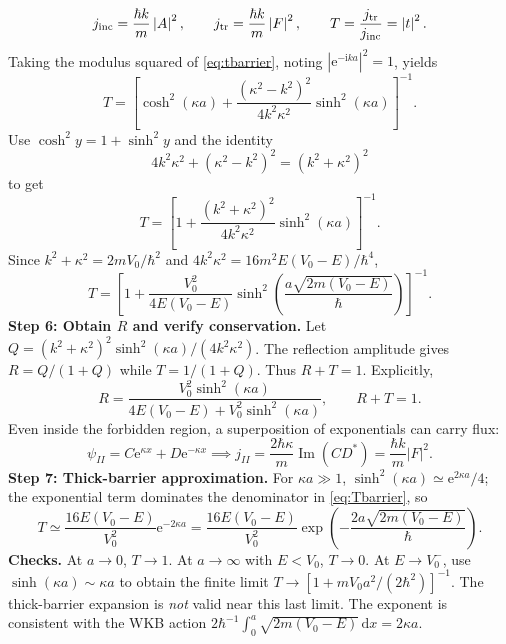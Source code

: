 \documentclass[11pt,a4paper]{article}
\newcommand{\dd}{\mathrm{d}}
\newcommand{\iu}{\mathrm{i}}
\newcommand{\ee}{\mathrm{e}}
\newcommand{\abs}[1]{\left|#1\right|}
\begin{document}
\begin{equation}
j_{\rm inc}=\frac{\hbar k}{m}\abs A^2,\qquad j_{\rm tr}=\frac{\hbar k}{m}\abs F^2,\qquad T=\frac{j_{\rm tr}}{j_{\rm inc}}=\abs t^2.
\end{equation}
Taking the modulus squared of \eqref{eq:tbarrier}, noting $\abs{\ee^{-\iu ka}}^2=1$, yields
\begin{equation}
T=\left[\cosh^2(\kappa a)+\frac{(\kappa^2-k^2)^2}{4k^2\kappa^2}\sinh^2(\kappa a)\right]^{-1}.
\end{equation}
Use $\cosh^2 y=1+\sinh^2y$ and the identity
\begin{equation}
4k^2\kappa^2+(\kappa^2-k^2)^2=(k^2+\kappa^2)^2
\end{equation}
to get
\begin{equation}
T=\left[1+\frac{(k^2+\kappa^2)^2}{4k^2\kappa^2}\sinh^2(\kappa a)\right]^{-1}.
\end{equation}
Since $k^2+\kappa^2=2mV_0/\hbar^2$ and $4k^2\kappa^2=16m^2E(V_0-E)/\hbar^4$,
\begin{equation}\label{eq:Tbarrier}
\boxed{T=\left[1+\frac{V_0^2}{4E(V_0-E)}\sinh^2\left(\frac{a\sqrt{2m(V_0-E)}}\hbar\right)\right]^{-1}.}
\end{equation}
\textbf{Step 6: Obtain $R$ and verify conservation.} Let $Q=(k^2+\kappa^2)^2\sinh^2(\kappa a)/(4k^2\kappa^2)$. The reflection amplitude gives $R=Q/(1+Q)$ while $T=1/(1+Q)$. Thus $R+T=1$. Explicitly,
\begin{equation}
\boxed{R=\frac{V_0^2\sinh^2(\kappa a)}{4E(V_0-E)+V_0^2\sinh^2(\kappa a)},\qquad R+T=1.}
\end{equation}
Even inside the forbidden region, a superposition of exponentials can carry flux:
\begin{equation}
\psi_{II}=C\ee^{\kappa x}+D\ee^{-\kappa x}\implies
j_{II}=\frac{2\hbar\kappa}{m}\operatorname{Im}(CD^*)=\frac{\hbar k}{m}\abs F^2.
\end{equation}
\textbf{Step 7: Thick-barrier approximation.} For $\kappa a\gg1$, $\sinh^2(\kappa a)\simeq\ee^{2\kappa a}/4$; the exponential term dominates the denominator in \eqref{eq:Tbarrier}, so
\begin{equation}
\boxed{T\simeq\frac{16E(V_0-E)}{V_0^2}\ee^{-2\kappa a}
=\frac{16E(V_0-E)}{V_0^2}\exp\left(-\frac{2a\sqrt{2m(V_0-E)}}{\hbar}\right).}
\end{equation}
\textbf{Checks.} At $a\to0$, $T\to1$. At $a\to\infty$ with $E<V_0$, $T\to0$. At $E\to V_0^-$, use $\sinh(\kappa a)\sim\kappa a$ to obtain the finite limit $T\to[1+mV_0a^2/(2\hbar^2)]^{-1}$. The thick-barrier expansion is \emph{not} valid near this last limit. The exponent is consistent with the WKB action $2\hbar^{-1}\int_0^a\sqrt{2m(V_0-E)}\,\dd x=2\kappa a$.
\end{document}
